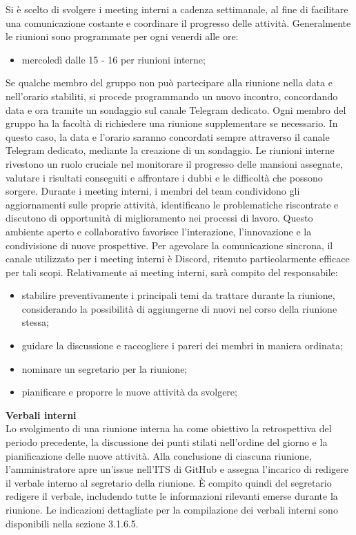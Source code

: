 Si è scelto di svolgere i meeting interni a cadenza settimanale, al fine di facilitare una comunicazione costante e coordinare il progresso delle attività.
Generalmente le riunioni sono programmate per ogni venerdi alle ore:
\begin{itemize}
    \item mercoledì dalle 15 - 16 per riunioni interne;
\end{itemize}
Se qualche membro del gruppo non può partecipare alla riunione nella data e nell’orario stabiliti, si procede programmando un nuovo incontro, concordando data e ora tramite un sondaggio sul canale Telegram dedicato.
Ogni membro del gruppo ha la facoltà di richiedere una riunione supplementare se necessario. In questo caso, la data e l’orario saranno concordati sempre attraverso il canale Telegram dedicato, mediante la creazione di un sondaggio.
Le riunioni interne rivestono un ruolo cruciale nel monitorare il progresso delle mansioni assegnate, valutare i risultati conseguiti e affrontare i dubbi e le difficoltà che possono sorgere. Durante i meeting interni, i membri del team condividono gli aggiornamenti sulle proprie attività, identificano le problematiche riscontrate e discutono di opportunità di miglioramento nei processi di lavoro. Questo ambiente aperto e collaborativo favorisce l’interazione, l’innovazione e la condivisione di nuove prospettive. Per agevolare la comunicazione sincrona, il canale utilizzato per i meeting interni è Discord, ritenuto particolarmente efficace per tali scopi.
Relativamente ai meeting interni, sarà compito del responsabile:
\begin{itemize}
    \item stabilire preventivamente i principali temi da trattare durante la riunione, considerando la possibilità di aggiungerne di nuovi nel corso della riunione stessa;
    \item guidare la discussione e raccogliere i pareri dei membri in maniera ordinata;
    \item nominare un segretario per la riunione;
    \item pianificare e proporre le nuove attività da svolgere;
\end{itemize}
\textbf{Verbali interni}\\
Lo svolgimento di una riunione interna ha come obiettivo la retrospettiva del periodo precedente, la discussione dei punti stilati nell’ordine del giorno e la pianificazione delle nuove attività.
Alla conclusione di ciascuna riunione, l’amministratore apre un’issue nell’ITS di GitHub e assegna l’incarico di redigere il verbale interno al segretario della riunione. È compito quindi del segretario redigere il verbale, includendo tutte le informazioni rilevanti emerse durante la riunione. Le indicazioni dettagliate per la compilazione dei verbali interni sono disponibili nella sezione 3.1.6.5.

